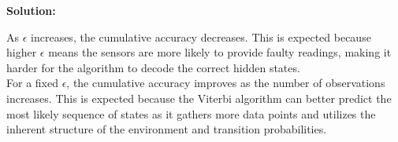 \documentclass{article}
\newenvironment{solution}{\color{blue} \smallskip \textbf{Solution:}}{}
\begin{document}
\begin{enumerate}[(a)]
    \begin{solution}


As \( \epsilon \) increases, the cumulative accuracy decreases. This is expected because higher \( \epsilon \) means the sensors are more likely to provide faulty readings, making it harder for the algorithm to decode the correct hidden states.\\


For a fixed \( \epsilon \), the cumulative accuracy improves as the number of observations increases. This is expected because the Viterbi algorithm can better predict the most likely sequence of states as it gathers more data points and utilizes the inherent structure of the environment and transition probabilities.






    \end{solution}
\end{enumerate}
\end{document}

